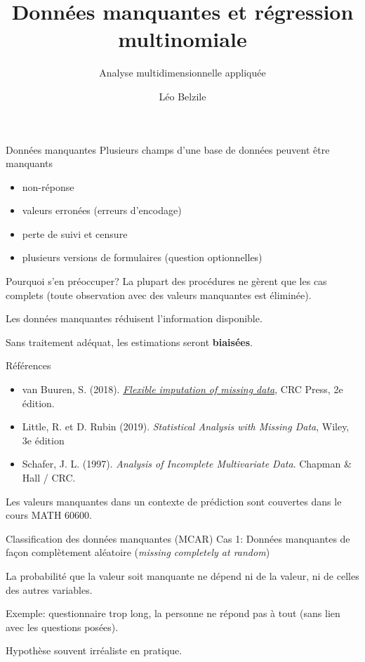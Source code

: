 \documentclass[
  ignorenonframetext,
]{beamer}
\title{Données manquantes et régression multinomiale}
\subtitle{Analyse multidimensionnelle appliquée}
\author{Léo Belzile}
\date{}
\institute{HEC Montréal}
\providecommand{\tightlist}{%
  \setlength{\itemsep}{0pt}\setlength{\parskip}{0pt}}\usepackage{longtable,booktabs,array}
\begin{document}
\frame{\titlepage}


\begin{frame}{Données manquantes}
\label{donnuxe9es-manquantes}
Plusieurs champs d'une base de données peuvent être manquants

\begin{itemize}
\tightlist
\item
  non-réponse
\item
  valeurs erronées (erreurs d'encodage)
\item
  perte de suivi et censure
\item
  plusieurs versions de formulaires (question optionnelles)
\end{itemize}
\end{frame}

\begin{frame}{Pourquoi s'en préoccuper?}
\label{pourquoi-sen-pruxe9occuper}
La plupart des procédures ne gèrent que les cas complets (toute
observation avec des valeurs manquantes est éliminée).

Les données manquantes réduisent l'information disponible.

Sans traitement adéquat, les estimations seront \textbf{biaisées}.
\end{frame}

\begin{frame}{Références}
\label{ruxe9fuxe9rences}
\begin{itemize}
\tightlist
\item
  van Buuren, S. (2018).
  \href{https://stefvanbuuren.name/fimd/}{\emph{Flexible imputation of
  missing data}}, CRC Press, 2e édition.
\item
  Little, R. et D. Rubin (2019). \emph{Statistical Analysis with Missing
  Data}, Wiley, 3e édition
\item
  Schafer, J. L. (1997). \emph{Analysis of Incomplete Multivariate
  Data}. Chapman \& Hall / CRC.
\end{itemize}

Les valeurs manquantes dans un contexte de prédiction sont couvertes
dans le cours MATH 60600.
\end{frame}

\begin{frame}{Classification des données manquantes (MCAR)}
\label{classification-des-donnuxe9es-manquantes-mcar}
Cas 1: Données manquantes de façon complètement aléatoire (\emph{missing
completely at random})

La probabilité que la valeur soit manquante ne dépend ni de la valeur,
ni de celles des autres variables.

Exemple: questionnaire trop long, la personne ne répond pas à tout (sans
lien avec les questions posées).

Hypothèse souvent irréaliste en pratique.
\end{frame}
\end{document}
